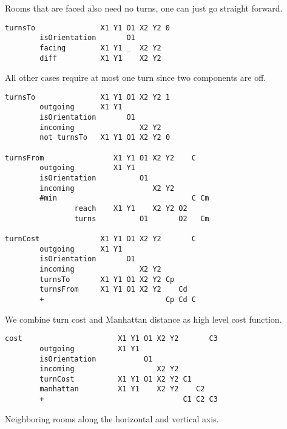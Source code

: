 Rooms that are faced also need no turns, one can just go straight
forward.

\begin{verbatim}
turnsTo               X1 Y1 O1 X2 Y2 0
        isOrientation       O1
        facing        X1 Y1 _  X2 Y2
        diff          X1 Y1    X2 Y2
\end{verbatim}

All other cases require at most one turn since two components are off.

\begin{verbatim}
turnsTo               X1 Y1 O1 X2 Y2 1
        outgoing      X1 Y1
        isOrientation       O1
        incoming               X2 Y2
        not turnsTo   X1 Y1 O1 X2 Y2 0

turnsFrom                X1 Y1 O1 X2 Y2    C
        outgoing         X1 Y1
        isOrientation          O1
        incoming                  X2 Y2
        #min                               C Cm
                reach    X1 Y1    X2 Y2 O2
                turns          O1       O2   Cm

turnCost              X1 Y1 O1 X2 Y2       C
        outgoing      X1 Y1
        isOrientation       O1
        incoming               X2 Y2
        turnsTo       X1 Y1 O1 X2 Y2 Cp
        turnsFrom     X1 Y1 O1 X2 Y2    Cd
        +                            Cp Cd C
\end{verbatim}

We combine turn cost and Manhattan distance as high level cost function.

\begin{verbatim}
cost                      X1 Y1 O1 X2 Y2       C3
        outgoing          X1 Y1
        isOrientation           O1
        incoming                   X2 Y2
        turnCost          X1 Y1 O1 X2 Y2 C1
        manhattan         X1 Y1    X2 Y2    C2
        +                                C1 C2 C3
\end{verbatim}

Neighboring rooms along the horizontal and vertical axis.

